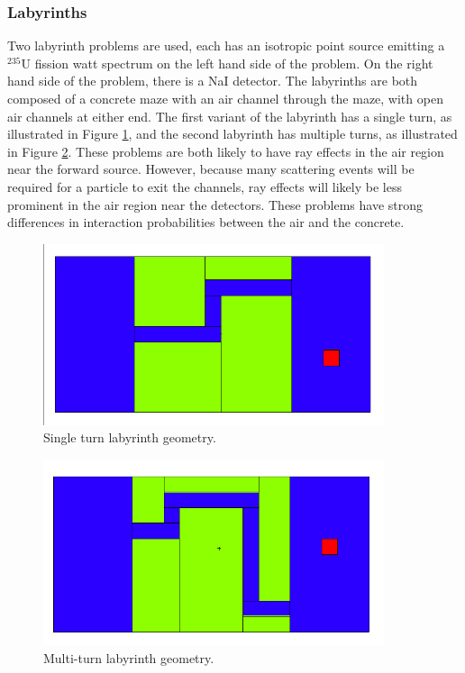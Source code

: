 \subsubsection*{Labyrinths}

Two labyrinth problems are used, each has an isotropic point source emitting a $^{235}$U fission watt spectrum on the left hand side of the
problem.
On the right hand side of the problem, there is a NaI detector.
The labyrinths are both composed of a concrete maze with an air channel through the maze, with open air channels at either end. The first variant of the
labyrinth has a single turn, as illustrated in Figure \ref{fig:maze2geom}, and
the second labyrinth has multiple turns, as illustrated in Figure
\ref{fig:maze1geom}. These problems are both
likely to have ray effects in the air region near the forward source. However,
because many scattering events will be required for a particle to exit the
channels, ray effects will likely be less prominent in the
air region near the detectors. 
These  problems have strong
differences in interaction probabilities between the air and the concrete. 

\begin{figure}[h!]
  \centering
  \includegraphics[width=10cm]{./chapters/characterization_probs/figures/geometries/maze2.png}
  \caption[Single turn labyrinth geometry.]{Single turn labyrinth geometry.}
  \label{fig:maze2geom}
\end{figure}

\begin{figure}[h!]
  \centering
  \includegraphics[width=10cm]{./chapters/characterization_probs/figures/geometries/maze1.png}
  \caption[Multi-turn labyrinth geometry.]{Multi-turn labyrinth geometry.}
  \label{fig:maze1geom}
\end{figure}

